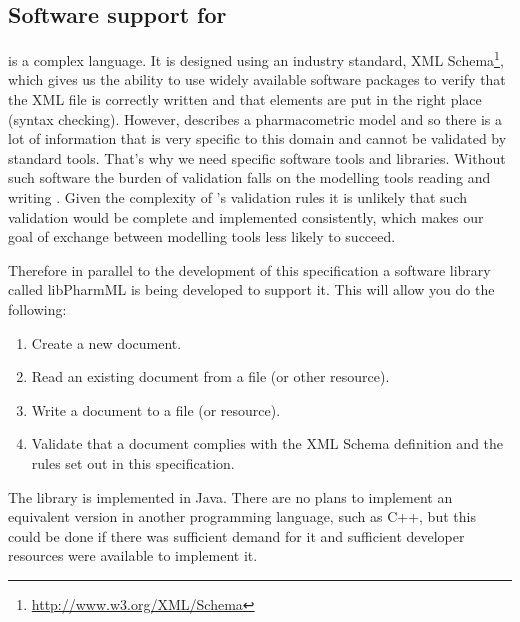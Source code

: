 \subsection{Software support for \pharmml}
\label{sec:libpharmml}

\pharmml is a complex language. It is designed using an industry
standard, XML Schema\footnote{\url{http://www.w3.org/XML/Schema}}, which gives us the
ability to use widely available software packages to verify that the
XML file is correctly written and that elements are put in the right
place (syntax checking). However, \pharmml describes a pharmacometric
model and so there is a lot of information that is very specific to
this domain and cannot be validated by standard tools.  That's why we need
\pharmml specific software tools and libraries. Without such software
the burden of validation falls on the modelling tools reading and
writing \pharmml. Given the complexity of \pharmml's validation rules
it is unlikely that such validation would be complete and implemented
consistently, which makes our goal of exchange between modelling
tools less likely to succeed.

Therefore in parallel to the development of this specification a software library 
called libPharmML is being developed to support it.  This will allow you do the following:
%
\begin{enumerate}
\item Create a new \pharmml document.
\item Read an existing \pharmml document from a file (or other
  resource).
\item Write a \pharmml document to a file (or resource).
\item Validate that a \pharmml document complies with the XML Schema
  definition and the rules set out in this specification.
\end{enumerate}
%
The library is implemented in Java. There are no plans to implement an equivalent
version in another programming language, such as C++, but this could be done if
there was sufficient demand for it and sufficient developer resources were available
to implement it.
